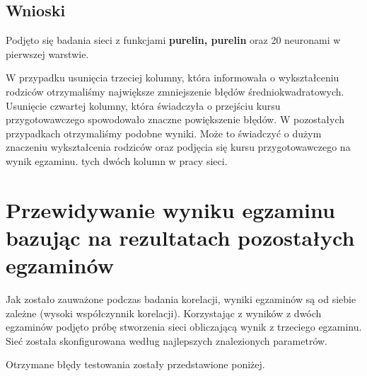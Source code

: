 \documentclass[12pt]{article}
\begin{document}
\subsection{Wnioski}
Podjęto się badania sieci z funkcjami \textbf{purelin, purelin} oraz 20 neuronami w pierwszej warstwie. 

W przypadku usunięcia trzeciej kolumny, która informowała o wykształceniu rodziców otrzymaliśmy największe zmniejszenie błędów średniokwadratowych. Usunięcie czwartej kolumny, która świadczyła o przejściu kursu przygotowawczego spowodowało znaczne powiększenie błędów. W pozostałych przypadkach otrzymaliśmy podobne wyniki. Może to świadczyć o dużym znaczeniu wykształcenia rodziców oraz podjęcia się kursu przygotowawczego na wynik egzaminu. tych dwóch kolumn w pracy sieci.

\pagebreak
\section{Przewidywanie wyniku egzaminu bazując na rezultatach pozostałych egzaminów}
Jak zostało zauważone podczas badania korelacji, wyniki egzaminów są od siebie zależne (wysoki współczynnik korelacji). Korzystając z wyników z dwóch egzaminów podjęto próbę stworzenia sieci obliczającą wynik z trzeciego egzaminu. Sieć została skonfigurowana według najlepszych znalezionych parametrów.

Otrzymane błędy testowania zostały przedstawione poniżej.
\end{document}
